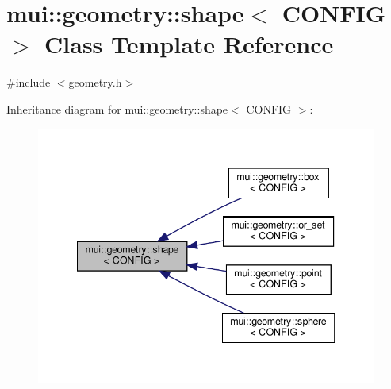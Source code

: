 \hypertarget{classmui_1_1geometry_1_1shape}{}\section{mui\+:\+:geometry\+:\+:shape$<$ C\+O\+N\+F\+IG $>$ Class Template Reference}
\label{classmui_1_1geometry_1_1shape}


{\ttfamily \#include $<$geometry.\+h$>$}



Inheritance diagram for mui\+:\+:geometry\+:\+:shape$<$ C\+O\+N\+F\+IG $>$\+:
\nopagebreak
\begin{figure}[H]
\begin{center}
\leavevmode
\includegraphics[width=341pt]{classmui_1_1geometry_1_1shape__inherit__graph}
\end{center}
\end{figure}
